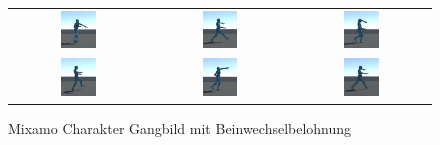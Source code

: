 \begin{figure}[H]
  \centering
  \begin{tabular}{ccc}
    \includegraphics[width=0.27\textwidth]{img/charakter_mixamo_laufen1} & \includegraphics[width=0.27\textwidth]{img/charakter_mixamo_laufen2}  & \includegraphics[width=0.27\textwidth]{img/charakter_mixamo_laufen3} \\
    \includegraphics[width=0.27\textwidth]{img/charakter_mixamo_laufen4}  & \includegraphics[width=0.27\textwidth]{img/charakter_mixamo_laufen5}  & \includegraphics[width=0.27\textwidth]{img/charakter_mixamo_laufen6} \\
  \end{tabular}
  \caption{Mixamo Charakter Gangbild mit Beinwechselbelohnung}
  \label{fig:mixamo_versuch11_gangbild}
\end{figure}

